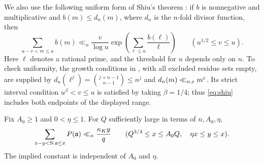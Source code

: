 We also use the following uniform form of Shiu's theorem
\cite{Shiu1980,Pollack2020}: if $b$ is nonnegative and multiplicative
and $b(m)\le d_n(m)$, where $d_n$ is the $n$-fold divisor function,
then
\begin{equation}\label{eq:shiu}
 \sum_{u-v<m\le u}b(m)
 \ll_n\frac v{\log u}
       \exp\left(\sum_{\ell\le u}\frac{b(\ell)}\ell\right)
 \qquad(u^{1/2}\le v\le u).
\end{equation}
Here $\ell$ denotes a rational prime, and the threshold for $u$
depends only on $n$. To check uniformity, the growth conditions in
\cite[Theorem~1.1]{Pollack2020}, with all excluded residue sets
empty, are supplied by
$d_n(\ell^j)=\binom{j+n-1}{n-1}\le n^j$ and
$d_n(m)\ll_{n,\varepsilon}m^\varepsilon$. Its strict interval condition
$u^\beta<v\le u$ is satisfied by taking $\beta=1/4$; thus
\eqref{eq:shiu} includes both endpoints of the displayed range.

\begin{proposition}\label{prop:weighted-count}
Fix $A_0\ge1$ and $0<\eta\le1$. For $Q$ sufficiently large in terms
of $n,A_0,\eta$,
\begin{equation}\label{eq:weighted-count}
 \sum_{x-y<\operatorname{N}\mathfrak a\le x}P(\mathfrak a)
 \ll_n \frac{\kappa_K y}{q}
 \qquad
 (Q^{3/4}\le x\le A_0Q,\quad \eta x\le y\le x).
\end{equation}
The implied constant is independent of $A_0$ and $\eta$.
\end{proposition}

